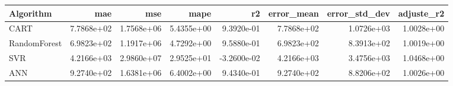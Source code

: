 \begin{tabular}{lrrrrrrr}
\toprule
Algorithm & mae & mse & mape & r2 & error_mean & error_std_dev & adjuste_r2 \\
\midrule
CART & 7.7868e+02 & 1.7568e+06 & 5.4355e+00 & 9.3920e-01 & 7.7868e+02 & 1.0726e+03 & 1.0028e+00 \\
RandomForest & 6.9823e+02 & 1.1917e+06 & 4.7292e+00 & 9.5880e-01 & 6.9823e+02 & 8.3913e+02 & 1.0019e+00 \\
SVR & 4.2166e+03 & 2.9860e+07 & 2.9525e+01 & -3.2600e-02 & 4.2166e+03 & 3.4756e+03 & 1.0468e+00 \\
ANN & 9.2740e+02 & 1.6381e+06 & 6.4002e+00 & 9.4340e-01 & 9.2740e+02 & 8.8206e+02 & 1.0026e+00 \\
\bottomrule
\end{tabular}
